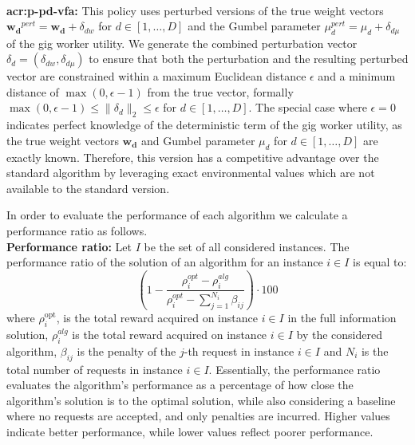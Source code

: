 ~\\ 
\textbf{\gls{acr:p-pd-vfa}:} This policy uses perturbed versions of the true weight vectors \(\mathbf{w_d}^{pert} = \mathbf{w_d} + \delta_{dw} \) for \( d \in [1,\dots,D] \) and the Gumbel parameter \( \mu_d^{pert} = \mu_d + \delta_{d\mu} \) of the gig worker utility. We generate the combined perturbation vector \( \delta_d = (\delta_{dw}, \delta_{d\mu}) \) to ensure that both the perturbation and the resulting perturbed vector are constrained within a maximum Euclidean distance $\epsilon$ and a minimum distance of $\max(0,\epsilon - 1)$ from the true vector, formally \(\max(0,\epsilon - 1) \leq \|\delta_d\|_2 \leq \epsilon \) for \( d \in [1,\dots,D] \). The special case where \( \epsilon = 0 \) indicates perfect knowledge of the deterministic term of the gig worker utility, as the true weight vectors \( \mathbf{w_d} \) and Gumbel parameter $\mu_d$ for \( d \in [1,\dots,D] \) are exactly known. Therefore, this version has a competitive advantage over the standard algorithm by leveraging exact environmental values which are not available to the standard version.

In order to evaluate the performance of each algorithm we calculate a performance ratio as follows.
~\\
\textbf{Performance ratio:}
Let $I$ be the set of all considered instances. The performance ratio of the solution of an algorithm for an instance $i \in I$ is equal to:
$$
\left(1 - \frac{\rho^{opt}_i - \rho^{alg}_i}{\rho^{opt}_i - \sum_{j=1}^{N_i} \beta_{ij}} \right) \cdot 100
$$
\noindent where $\rho^{\text{opt}}_i $,  is the total reward acquired on instance $i \in I$ in the full information solution, $\rho^{alg}_i$ is the total reward acquired on instance $i \in I$ by the considered algorithm, $\beta_{ij}$ is the penalty of the $j$-th request in instance $i \in I$ and $N_i$ is the total number of requests in instance $i \in I$. Essentially, the performance ratio evaluates the algorithm’s performance as a percentage of how close the algorithm’s solution is to the optimal solution, while also considering a baseline where no requests are accepted, and only penalties are incurred. Higher values indicate better performance, while lower values reflect poorer performance.
